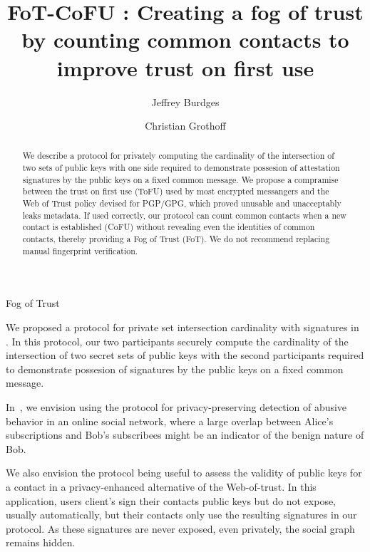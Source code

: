 \documentclass{article}
\title{FoT-CoFU : Creating a fog of trust by counting common contacts to improve trust on first use}
\author{Jeffrey Burdges \and Christian Grothoff}
\begin{document}
\maketitle

\begin{abstract}
We describe a protocol for privately computing the cardinality of 
the intersection of two sets of public keys with one side required
to demonstrate possesion of attestation signatures by the public
keys on a fixed common message.  We propose a compramise between
the trust on first use (ToFU) used by most encrypted messangers and
the Web of Trust policy devised for PGP/GPG, which proved unusable
and unacceptably leaks metadata.  If used correctly, our protocol
can count common contacts when a new contact is established (CoFU)
without revealing even the identities of common contacts, thereby
providing a Fog of Trust (FoT).  We do not recommend replacing
manual fingerprint verification.
\end{abstract}


\def\Z{\mathbb{Z}}

\newcommand*\set[1]{\{ #1 \}} %
\newcommand*\Set[1]{\left\{ #1 \right\}}
\newcommand*\setst[2]{\{ #1 | #2 \}}
\newcommand*\Setst[2]%
        {\left\{\,#1\vphantom{#2} \;\right|\left. #2 \vphantom{#1}\,\right\}}

\newcommand*\List[1]{\left[ #1 \right]}  %
\newcommand*\listst[2]{[ #1 | #2 ]}
\newcommand*\Listst[2]%
        {\left[\,#1\vphantom{#2} \;\right|\left. #2 \vphantom{#1}\,\right]}

\def\Alice{{\textrm{Alice}}}
\def\Bob{{\textrm{Bob}}}

\def\mathcomma{,}
\def\mathperiod{.}



Fog of Trust

We proposed a protocol for private set intersection cardinality with
signatures in \cite{p4t}.  In this protocol, our two participants
securely compute the cardinality of the intersection of two secret
sets of public keys with the second participants required to
demonstrate possesion of signatures by the public keys on a fixed
common message.

In~\cite{p4t}, we envision using the protocol for privacy-preserving
detection of abusive behavior in an online social network, where a
large overlap between Alice's subscriptions and Bob's subscribees
might be an indicator of the benign nature of Bob.

We also envision the protocol being useful to assess the validity of
public keys for a contact in a privacy-enhanced alternative of the
Web-of-trust.  In this application, users client's sign their
contacts public keys but do not expose, usually automatically, but
their contacts only use the resulting signatures in our protocol.
As these signatures are never exposed, even privately, the social
graph remains hidden. 
\end{document}
